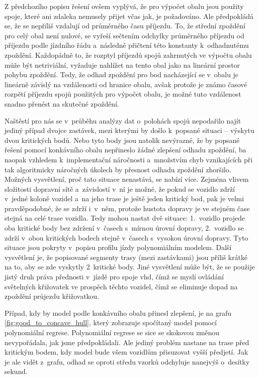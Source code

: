 \bigbreak

Z předchozího popisu řešení ovšem vyplývá, že pro výpočet obalu jsou použity spoje, které ani zdaleka nemusely přijet včas jak, je požadováno. Ale předpokládá se, že se nepříliš vzdalují od průměrného času příjezdu. To, že střední zpoždění pro celý obal není nulové, se vyřeší sečtením odchylky průměrného příjezdu od příjezdu podle jízdního řádu a~následně přičtení této konstanty k~odhadnutému zpoždění. Každopádně to, že rozptyl příjezdů spojů zahrnutých ve výpočtu obalu může být netriviální, vyžaduje nahlížet na tento obal jako na lineární prostor pohybu zpoždění. Tedy, že odhad zpoždění pro bod nacházející se v~obalu je lineárně závislý na vzdálenosti od hranice obalu, avšak protože je známo časové rozpětí příjezdu spojů použitých pro výpočet obalu, je možné tuto vzdálenost snadno přenést na skutečné zpoždění.


\bigbreak

Naštěstí pro nás se v~průběhu analýzy dat o~polohách spojů nepodařilo najít jediný případ dvojce zastávek, mezi kterými by došlo k~popsané situaci -- výskytu dvou kritických bodů. Nebo tyto body jsou natolik nevýrazné, že by popsané řešení pomocí konkávního obalu nepřineslo žádné zlepšení odhadu zpoždění, ba naopak vzhledem k~implementační náročnosti a~množstvím chyb vznikajících při tak algoritmicky náročných úkolech by přesnost odhadu zpoždění zhoršilo. Možných vysvětlení, proč tato situace nenastává, se nabízí více. Zejména vlivem složitosti dopravní sítě a~závislostí v~ní je možné, že pokud se vozidlo zdrží v~jedné koloně vozidel a~na jeho trase je ještě jeden kritický bod, pak je velmi pravděpodobné, že se zdrží i~v~něm, protože hustota dopravy je ve stejném čase stejná na celé trase vozidla. Tedy mohou nastat dvě situace: 1.~vozidlo projede oba kritické body bez zdržení v~časech s~mírnou úrovní dopravy, 2.~vozidlo se zdrží v~obou kritických bodech stejně v~časech s~vysokou úrovní dopravy. Tyto situace jsou pokryty v~popisu profilu jízdy polynomiálním modelem. Další vysvětlení je, že popisované segmenty trasy (mezi zastávkami) jsou příliš krátké na to, aby se zde vyskytly 2~kritické body. Jiné vysvětlení může být, že se použije jistý druh práva přednosti v~jízdě pro spoje \gls{vhd}, čímž se myslí ovládání světelných křižovatek ve prospěch těchto vozidel, čímž se eliminuje dopad na zpoždění průjezdu křižovatkou.


\bigbreak

Případ, kdy by model podle konkávního obalu přinesl zlepšení, je na grafu \ref{fig:good_to_concave_hull}, který zobrazuje spočítaný model pomocí polynomiální regrese. Polynomiální regrese se sice se skokovou změnou nevypořádala, jak jsme předpokládali. Ale jediný problém nastane na trase před kritickým bodem, kdy model bude všem vozidlům přisuzovat vyšší předjetí. Jak je ale vidět z~grafu, odhad se oproti středu vzorků odchyluje nanejvýš o~desítky sekund.


